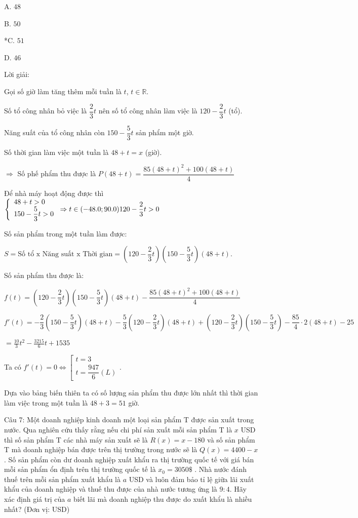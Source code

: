 \documentclass[a4paper,12pt]{article}
\begin{document}
A. \(48\)

B. \(50\)

*C. \(51\)

D. \(46\)

Lời giải:


Gọi số giờ làm tăng thêm mỗi tuần là \(t\), \(t \in \mathbb{R}\).

Số tổ công nhân bỏ việc là \(\dfrac{2}{3} t\) nên số tổ công nhân làm việc là \(120 - \dfrac{2}{3} t\) (tổ).

Năng suất của tổ công nhân còn \(150 - \dfrac{5}{3} t\) sản phẩm một giờ.

Số thời gian làm việc một tuần là \(48 + t = x\) (giờ).

\(\Rightarrow\) Số phế phẩm thu được là \(P(48 + t) = \dfrac{85(48 + t)^2 + 100(48 + t)}{4}\)

Để nhà máy hoạt động được thì \(\left\{\begin{array}{l}48 + t > 0 \\ 150 - \dfrac{5}{3} t > 0\end{array}\right. \Rightarrow t \in(-48.0 ; 90.0) \\ 120 - \dfrac{2}{3} t > 0\)

Số sản phẩm trong một tuần làm được:

\(S = \text{Số tổ x Năng suất x Thời gian} = \left(120 - \dfrac{2}{3} t\right)\left(150 - \dfrac{5}{3} t\right)(48 + t)\).

Số sản phẩm thu được là:

\(f(t) = \left(120 - \dfrac{2}{3} t\right)\left(150 - \dfrac{5}{3} t\right)(48 + t) - \dfrac{85(48 + t)^2 + 100(48 + t)}{4}\)

\(f'(t) = -\dfrac{2}{3}\left(150 - \dfrac{5}{3} t\right)(48 + t) - \dfrac{5}{3}\left(120 - \dfrac{2}{3} t\right)(48 + t) + \left(120 - \dfrac{2}{3} t\right)\left(150 - \dfrac{5}{3} t\right) - \dfrac{85}{4} \cdot 2(48 + t) - 25\)

\(= \frac{10}{3}t^{2} - \frac{3215}{6}t + 1535\)

Ta có \(f'(t) = 0 \Leftrightarrow \left[\begin{array}{l}t = 3 \\ t = \dfrac{947}{6}(L)\end{array}\right.\).

Dựa vào bảng biến thiên ta có số lượng sản phẩm thu được lớn nhất thì thời gian làm việc trong một tuần là \(48 + 3 = 51\) giờ.




Câu 7: Một doanh nghiệp kinh doanh một loại sản phẩm T được sản xuất trong nước. Qua nghiên cứu thấy rằng nếu chi phí sản xuất mỗi sản phẩm T là \(x\) USD thì số sản phẩm T các nhà máy sản xuất sẽ là \(R(x)=x-180\) và số sản phẩm T mà doanh nghiệp bán được trên thị trường trong nước sẽ là \(Q(x)=4400-x\). Số sản phẩm còn dư doanh nghiệp xuất khẩu ra thị trường quốc tế với giá bán mỗi sản phẩm ổn định trên thị trường quốc tế là \(x_0=3050 \$\) . Nhà nước đánh thuế trên mỗi sản phẩm xuất khẩu là \(a\) USD và luôn đảm bảo tỉ lệ giữa lãi xuất khẩu của doanh nghiệp và thuế thu được của nhà nước tương ứng là \(9: 4\). Hãy xác định giá trị của \(a\) biết lãi mà doanh nghiệp thu được do xuất khẩu là nhiều nhất? (Đơn vị: USD)
\end{document}
